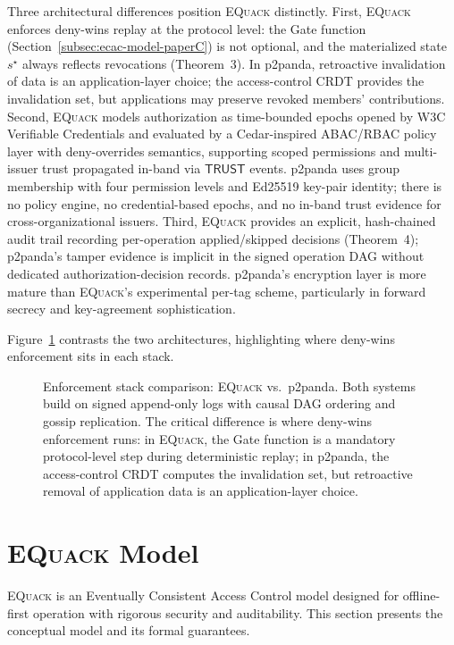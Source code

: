 \documentclass[10pt,journal,compsoc]{IEEEtran}
\newcommand{\equack}{\textsc{EQuack}}
\begin{document}
Three architectural differences position \equack{} distinctly.
First, \equack{} enforces deny-wins replay at the protocol level:
the Gate function (Section~\ref{subsec:ecac-model-paperC}) is not optional, and the
materialized state~$s^\star$ always reflects revocations
(Theorem~3). In p2panda, retroactive invalidation of data is
an application-layer choice; the access-control CRDT provides
the invalidation set, but applications may preserve revoked
members' contributions. Second, \equack{} models authorization as
time-bounded epochs opened by W3C Verifiable Credentials and
evaluated by a Cedar-inspired ABAC/RBAC policy layer with
deny-overrides semantics, supporting scoped permissions and
multi-issuer trust propagated in-band via
$\mathsf{TRUST}$ events. p2panda uses group membership with four permission
levels and Ed25519 key-pair identity; there is no policy engine,
no credential-based epochs, and no in-band trust evidence for
cross-organizational issuers. Third, \equack{} provides an explicit,
hash-chained audit trail recording per-operation applied/skipped
decisions (Theorem~4); p2panda's tamper evidence is implicit in
the signed operation DAG without dedicated authorization-decision
records. p2panda's encryption layer is more mature than
\equack{}'s experimental per-tag scheme, particularly in forward
secrecy and key-agreement sophistication.

Figure~\ref{fig:enforcement-compare-paperC} contrasts the two architectures, highlighting where deny-wins enforcement sits in each stack.

\begin{figure}[htbp]
\centering
\resizebox{\textwidth}{!}{}
\caption{Enforcement stack comparison: \equack{} vs.\ p2panda. Both systems build on signed append-only logs with causal DAG ordering and gossip replication. The critical difference is where deny-wins enforcement runs: in \equack{}, the Gate function is a mandatory protocol-level step during deterministic replay; in p2panda, the access-control CRDT computes the invalidation set, but retroactive removal of application data is an application-layer choice.}
\label{fig:enforcement-compare-paperC}
\end{figure}

\section{\equack{} Model}
\label{sec:model-paperC}

\equack{} is an Eventually Consistent Access Control model designed for offline-first operation with rigorous security and auditability. This section presents the conceptual model and its formal guarantees.
\end{document}
